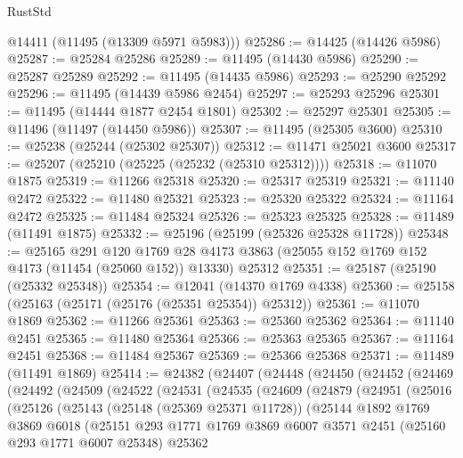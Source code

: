 \begin{lexlean}{RustStd}
\begin{coremodule}
      @14411
      (@11495 (@13309 @5971 @5983)))
@25286 := @14425 (@14426 @5986)
@25287 := @25284 @25286
@25289 := @11495 (@14430 @5986)
@25290 := @25287 @25289
@25292 := @11495 (@14435 @5986)
@25293 := @25290 @25292
@25296 := @11495 (@14439 @5986 @2454)
@25297 := @25293 @25296
@25301 := @11495 (@14444 @1877 @2454 @1801)
@25302 := @25297 @25301
@25305 := @11496 (@11497 (@14450 @5986))
@25307 := @11495 (@25305 @3600)
@25310 := @25238 (@25244 (@25302 @25307))
@25312 := @11471 @25021 @3600
@25317 := @25207 (@25210 (@25225 (@25232 (@25310 @25312))))
@25318 := @11070 @1875
@25319 := @11266 @25318
@25320 := @25317 @25319
@25321 := @11140 @2472
@25322 := @11480 @25321
@25323 := @25320 @25322
@25324 := @11164 @2472
@25325 := @11484 @25324
@25326 := @25323 @25325
@25328 := @11489 (@11491 @1875)
@25332 := @25196 (@25199 (@25326 @25328 @11728))
@25348 := @25165
    @291
    @120
    @1769
    @28
    @4173
    @3863
    (@25055 @152 @1769 @152 @4173 (@11454 (@25060 @152)) @13330)
    @25312
@25351 := @25187 (@25190 (@25332 @25348))
@25354 := @12041 (@14370 @1769 @4338)
@25360 := @25158 (@25163 (@25171 (@25176 (@25351 @25354)) @25312))
@25361 := @11070 @1869
@25362 := @11266 @25361
@25363 := @25360 @25362
@25364 := @11140 @2451
@25365 := @11480 @25364
@25366 := @25363 @25365
@25367 := @11164 @2451
@25368 := @11484 @25367
@25369 := @25366 @25368
@25371 := @11489 (@11491 @1869)
@25414 := @24382
    (@24407
      (@24448
        (@24450
          (@24452
            (@24469
              (@24492
                (@24509
                  (@24522
                    (@24531
                      (@24535
                        (@24609
                          (@24879
                            (@24951
                              (@25016
                                (@25126
                                  (@25143
                                    (@25148 (@25369 @25371 @11728))
                                    (@25144
                                      @1892
                                      @1769
                                      @3869
                                      @6018
                                      (@25151
                                        @293
                                        @1771
                                        @1769
                                        @3869
                                        @6007
                                        @3571
                                        @2451
                                        (@25160 @293 @1771 @6007 @25348)
                                        @25362

\end{coremodule}
\end{lexlean}
